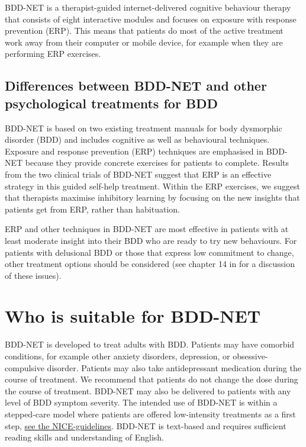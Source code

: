 \documentclass[]{book}
\begin{document}
BDD-NET is a therapist-guided internet-delivered cognitive behaviour therapy that consists of eight interactive modules and focuses on exposure with response prevention (ERP). This means that patients do most of the active treatment work away from their computer or mobile device, for example when they are performing ERP exercises.

\hypertarget{differences-between-bdd-net-and-other-psychological-treatments-for-bdd}{%
\subsection{Differences between BDD-NET and other psychological treatments for BDD}\label{differences-between-bdd-net-and-other-psychological-treatments-for-bdd}}

BDD-NET is based on two existing treatment manuals for body dysmorphic disorder (BDD) \citep{veale2010, wilhelm2013} and includes cognitive as well as behavioural techniques. Exposure and response prevention (ERP) techniques are emphasised in BDD-NET because they provide concrete exercises for patients to complete. Results from the two clinical trials of BDD-NET \citep{enander2014, enander2016} suggest that ERP is an effective strategy in this guided self-help treatment. Within the ERP exercises, we suggest that therapists maximise inhibitory learning \citep{craske2014} by focusing on the new insights that patients get from ERP, rather than habituation.

ERP and other techniques in BDD-NET are most effective in patients with at least moderate insight into their BDD who are ready to try new behaviours. For patients with delusional BDD or those that express low commitment to change, other treatment options should be considered (see chapter 14 in \citet{veale2010} for a discussion of these issues).

\hypertarget{who-is-suitable-for-bdd-net}{%
\section{Who is suitable for BDD-NET}\label{who-is-suitable-for-bdd-net}}

BDD-NET is developed to treat adults with BDD. Patients may have comorbid conditions, for example other anxiety disorders, depression, or obsessive-compulsive disorder. Patients may also take antidepressant medication during the course of treatment. We recommend that patients do not change the dose during the course of treatment. BDD-NET may also be delivered to patients with any level of BDD symptom severity. The intended use of BDD-NET is within a stepped-care model where patients are offered low-intensity treatments as a first step, \href{https://www.nice.org.uk/guidance/CG31/chapter/1-Guidance\#stepped-care-for-adults-young-people-and-children-with-ocd-or-bdd}{see the NICE-guidelines}. BDD-NET is text-based and requires sufficient reading skills and understanding of English.
\end{document}
